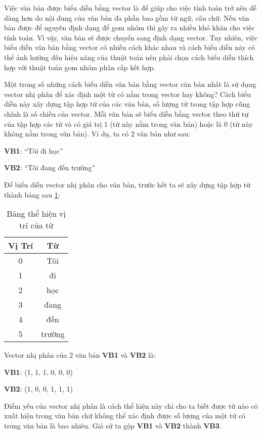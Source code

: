 Việc văn bản được biểu diễn bằng vector là để giúp cho việc tính toán trở nên dễ dàng hơn do nội dung của văn bản đa phần bao gồm từ ngữ, câu chữ.
Nếu văn bản được để nguyên định dạng để gom nhóm thì gây ra nhiều khó khăn cho việc tính toán.
Vì vậy, văn bản sẽ được chuyển sang định dạng vector.
Tuy nhiên, việc biểu diễn văn bản bằng vector có nhiều cách khác nhau và cách biểu diễn này có thể ảnh hưởng đến hiệu năng của thuật toán nên phải chọn cách biểu diễn thích hợp với thuật toán gom nhóm phân cấp kết hợp.

Một trong số những cách biểu diễn văn bản bằng vector căn bản nhất là sử dụng vector nhị phân để xác định một từ có nằm trong vector hay không?
Cách biểu diễn này xây dựng tập hợp từ của các văn bản, số lượng từ trong tập hợp cũng chính là số chiều của vector.
Mỗi văn bản sẽ biểu diễn bằng vector theo thứ tự của tập hợp các từ và có giá trị 1 (từ này nằm trong văn bản) hoặc là 0 (từ này không nằm trong văn bản).
Ví dụ, ta có 2 văn bản như sau:

\textbf{VB1}: ``Tôi đi học''

\textbf{VB2}: ``Tôi đang đến trường''

Để biểu diễn vector nhị phân cho văn bản, trước hết ta sẽ xây dựng tập hợp từ thành bảng sau \ref{tab:3_1}:
\begin{table}[h!]
\centering
\caption{Bảng thể hiện vị trí của từ}
\label{tab:3_1}
\begin{tabular}{|c|c|}
\hline
Vị Trí & Từ							\\ \hline
0    & Tôi                \\ \hline
1    & đi               \\ \hline
2    & học               \\ \hline
3    & đang               \\ \hline
4    & đến               \\ \hline
5    & trường               \\ \hline
\end{tabular}
\end{table}

Vector nhị phân của 2 văn bản \textbf{VB1} và \textbf{VB2} là:

\textbf{VB1}: (1, 1, 1, 0, 0, 0)

\textbf{VB2}: (1, 0, 0, 1, 1, 1)

Điểm yếu của vector nhị phân là cách thể hiện này chỉ cho ta biết được từ nào có xuất hiện trong văn bản chứ không thể xác định được số lượng của một từ có trong văn bản là bao nhiêu.
Giả sử ta gộp \textbf{VB1} và \textbf{VB2} thành \textbf{VB3}.

